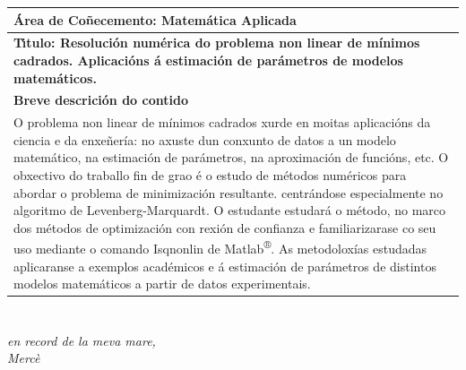 \documentclass[11pt,a4paper]{book}
\theoremstyle{definition}
\theoremstyle{remark}
\begin{document}
\begingroup
\renewcommand*{\arraystretch}{2.2}
\begin{tabular}{|l|}
	\hline
	
	{\bf \'Area de Co\~necemento:  \/ Matemática Aplicada}\\ \hline
	\begin{minipage}{11.5cm}
		{\vspace*{.2cm}
			\bf T\'{\i}tulo:   \/ \bf Resolución numérica do problema non linear de mínimos cadrados. Aplicacións á estimación de parámetros de modelos matemáticos.
			\vspace{.2cm}}
	\end{minipage}\\ \hline
	\bf Breve descrici\'on do contido\\ \hline
	\begin{minipage}{11.5cm}
		{\vspace*{.2cm}
O problema non linear de mínimos cadrados xurde en moitas aplicacións da ciencia e da enxeñería:
no axuste dun conxunto de datos a un modelo matemático, na estimación de parámetros,
na aproximación de funcións, etc. O obxectivo do traballo fin de grao é o estudo de métodos
numéricos para abordar o problema de minimización resultante. centrándose especialmente no
algoritmo de Levenberg-Marquardt. O estudante estudará o método, no marco dos métodos de
optimización con rexión de confianza e familiarizarase co seu uso mediante o comando
Isqnonlin de Matlab\textsuperscript{®}. As metodoloxías estudadas aplicaranse a exemplos académicos e á
estimación de parámetros de distintos modelos matemáticos a partir de datos experimentais.
		\vspace{.2cm}}
	\end{minipage}\\ \hline
\end{tabular}
\endgroup

\clearpage

\thispagestyle{empty}

\tableofcontents

\chapter*{}
\begin{flushright}
\textit{en record de la meva mare,\\
Mercè}
\end{flushright}
\thispagestyle{empty}

\clearpage
\thispagestyle{empty}

\mbox{}
\end{document}
